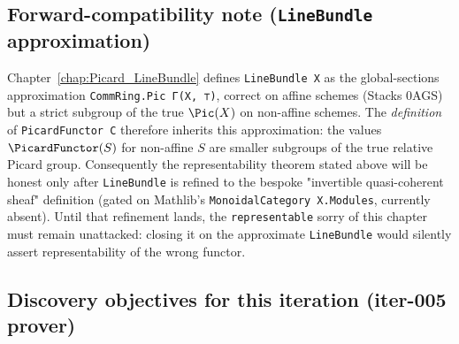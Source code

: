\subsection{Forward-compatibility note (\texttt{LineBundle} approximation)}

Chapter~\ref{chap:Picard_LineBundle} defines \lstinline{LineBundle X} as the global-sections approximation \lstinline{CommRing.Pic Γ(X, ⊤)}, correct on affine schemes (Stacks 0AGS) but a strict subgroup of the true $\Pic(X)$ on non-affine schemes. The \emph{definition} of \lstinline{PicardFunctor C} therefore inherits this approximation: the values $\PicardFunctor(S)$ for non-affine $S$ are smaller subgroups of the true relative Picard group. Consequently the representability theorem stated above will be honest only after \lstinline{LineBundle} is refined to the bespoke "invertible quasi-coherent sheaf" definition (gated on Mathlib's \lstinline{MonoidalCategory X.Modules}, currently absent). Until that refinement lands, the \lstinline{representable} sorry of this chapter must remain unattacked: closing it on the approximate \lstinline{LineBundle} would silently assert representability of the wrong functor.

\subsection{Discovery objectives for this iteration (iter-005 prover)}

